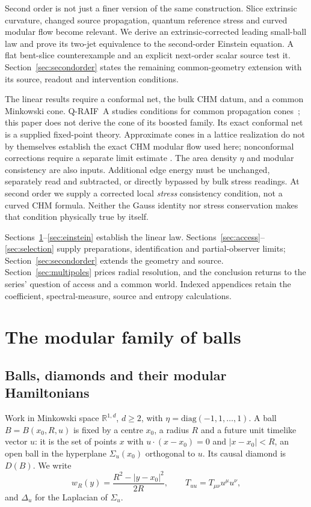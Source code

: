 \documentclass[12pt]{article}
\theoremstyle{definition}
\theoremstyle{remark}
\begin{document}
Second order is not just a finer version of the same construction.
Slice extrinsic curvature, changed source propagation, quantum reference
stress and curved modular flow become relevant. We derive an
extrinsic-corrected leading small-ball law and prove its two-jet
equivalence to the second-order Einstein equation. A flat bent-slice
counterexample and an explicit next-order scalar source test it.
Section~\ref{sec:secondorder} states the remaining common-geometry
extension with its source, readout and intervention conditions.

The linear results require a conformal net, the bulk CHM datum, and a
common Minkowski cone. Q-RAIF~A studies conditions for common propagation
cones~\cite{QRA}; this paper does not derive the cone of its boosted family.
Its exact conformal net is a supplied fixed-point theory. Approximate
cones in a lattice realization do not by themselves establish the
exact CHM modular flow used here; nonconformal corrections require a
separate limit estimate \cite{CGM2016}.
The area density $\eta$ and modular consistency are also inputs.
Additional edge energy must be unchanged, separately read and subtracted,
or directly bypassed by bulk stress readings. At second order we supply
a corrected local \emph{stress} consistency condition, not a curved CHM
formula. Neither the Gauss identity nor stress conservation makes that
condition physically true by itself.

Sections~\ref{sec:modular}--\ref{sec:einstein} establish the linear law.
Sections~\ref{sec:access}--\ref{sec:selection} supply preparations,
identification and partial-observer limits; Section~\ref{sec:secondorder}
extends the geometry and source. Section~\ref{sec:multipoles} prices
radial resolution, and the conclusion returns to the series' question
of access and a common world. Indexed appendices retain the coefficient,
spectral-measure, source and entropy calculations.

\section{The modular family of balls}\label{sec:modular}

\subsection{Balls, diamonds and their modular Hamiltonians}\label{subsec:chm}

Work in Minkowski space \(\mathbb R^{1,d}\), \(d\ge2\), with
\(\eta=\mathrm{diag}(-1,1,\dots,1)\). A ball \(B=B(x_0,R,u)\) is fixed by a centre \(x_0\), a
radius \(R\) and a future unit timelike vector \(u\): it is the set of points \(x\) with
\(u\cdot(x-x_0)=0\) and \(|x-x_0|<R\), an open ball in the hyperplane \(\Sigma_u(x_0)\)
orthogonal to \(u\). Its causal diamond is \(D(B)\). We write
\[
w_R(y)=\frac{R^2-|y-x_0|^2}{2R},\qquad T_{uu}=T_{\mu\nu}u^\mu u^\nu ,
\]
and \(\Delta_u\) for the Laplacian of \(\Sigma_u\).
\end{document}
